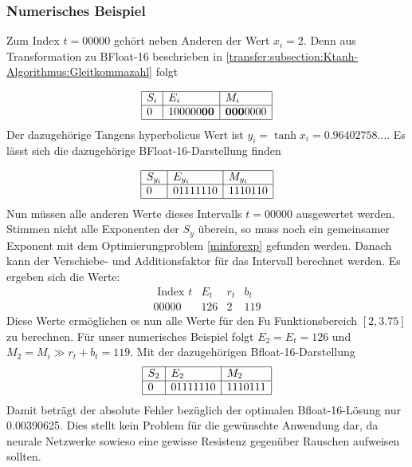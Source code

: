 \subsubsection{Numerisches Beispiel
	\label{transfer:subsection:Ktanh-Algorithmus:Num}}
Zum Index $t = 00000$ gehört neben Anderen der Wert $x_i = 2$. Denn aus Transformation zu BFloat-16 beschrieben in \ref{transfer:subsection:Ktanh-Algorithmus:Gleitkommazahl} folgt

$$
\begin{array}{|l|l|l|}
	\hline S_i & E_{i} & M_{i} \\
	\hline 0 & 100000 \textbf{00} & \textbf{000} 0000 \\
	\hline
\end{array}
$$
Der dazugehörige Tangens hyperbolicus Wert ist
$y_i = \tanh{x_i}=0.96402758\ldots$. Es lässt sich die dazugehörige BFloat-16-Darstellung finden

$$
\begin{array}{|l|l|l|}
	\hline S_{y_{i}} & E_{y_{i}} & M_{y_{i}} \\
	\hline 0 & 01111110 & 1110110 \\
	\hline
\end{array}
$$
Nun müssen alle anderen Werte dieses Intervalls $t = 00000$ ausgewertet werden. Stimmen nicht alle Exponenten der $S_{y}$ überein, so muss noch ein gemeinsamer Exponent mit dem Optimierungproblem \ref{minforexp} gefunden werden. Danach kann der Verschiebe- und Additionsfaktor für das Intervall berechnet werden. 
Es ergeben sich die Werte:
$$
\begin{array}{c|ccc}
	\text { Index } t & E_{t} & r_{t} & b_{t} \\
	\hline 00000 & 126 & 2 & 119
\end{array}
$$
Diese Werte ermöglichen es nun alle Werte für den Fu Funktionsbereich $[2,3.75]$ zu berechnen. Für unser numerisches Beispiel folgt $E_2 = E_t = 126$ und $M_2 = M_i \gg r_t + b_t = 119$. Mit der dazugehörigen Bfloat-16-Darstellung
$$
\begin{array}{|l|l|l|}
	\hline S_{2} & E_{2} & M_{2} \\
	\hline 0 & 01111110 & 1110111 \\
	\hline
\end{array}
$$
Damit beträgt der absolute Fehler bezüglich der optimalen Bfloat-16-Lösung nur 0.00390625. Dies stellt kein Problem für die gewünschte Anwendung dar, da neurale Netzwerke sowieso eine gewisse Resistenz gegenüber Rauschen aufweisen sollten.







